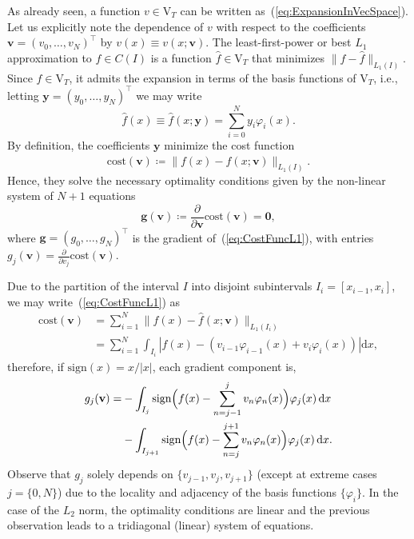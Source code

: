 \documentclass[a4paper,english]{IEEEtran}
\begin{document}
As already seen, a function $v\in{\mathrm{V}_{T}}$ can be written as~(\ref{eq:ExpansionInVecSpace}).
Let us explicitly note the dependence of $v$ with respect to the
coefficients ${\mathbf{v}}=(v_{0},\ldots,v_{N})^{\top}$ by $v(x)\equiv v(x;{\mathbf{v}})$.
The least-first-power or best ${L_{1}}$ approximation to $f\in C(I)$
is a function ${\hat{f}}\in{\mathrm{V}_{T}}$ that minimizes $\|f-{\hat{f}}\|_{{L_{1}}(I)}$.
Since ${\hat{f}}\in{\mathrm{V}_{T}}$, it admits the expansion in terms of the
basis functions of ${\mathrm{V}_{T}}$, i.e., letting ${\mathbf{y}}=(y_{0},\ldots,y_{N})^{\top}$
we may write
\begin{equation}
{\hat{f}}(x)\equiv{\hat{f}}(x;{\mathbf{y}})=\sum_{i=0}^{N}y_{i}\varphi_{i}(x).\label{eq:DefBestLOneApproxCoeffsY}
\end{equation}
By definition, the coefficients ${\mathbf{y}}$ minimize the cost function
\begin{equation}
{\text{cost}}(\mathbf{v})\coloneqq\|f(x)-{\hat{f}}(x;{\mathbf{v}})\|_{{L_{1}}(I)}.\label{eq:CostFuncL1}
\end{equation}
Hence, they solve the necessary optimality conditions given by the
non-linear system of $N+1$ equations
\begin{equation}
{\mathbf{g}}({\mathbf{v}})\coloneqq\frac{\partial}{\partial{\mathbf{v}}}{\text{cost}}({\mathbf{v}})=\mathbf{0},\label{eq:OptConditionsL1ComputeY}
\end{equation}
where ${\mathbf{g}}=(g_{0},\ldots,g_{N})^{\top}$ is the gradient of~(\ref{eq:CostFuncL1}),
with entries $g_{j}({\mathbf{v}})=\frac{\partial}{\partial v_{j}}{\text{cost}}({\mathbf{v}})$. 

Due to the partition of the interval $I$ into disjoint subintervals
$I_{i}=[x_{i-1},x_{i}]$, we may write~(\ref{eq:CostFuncL1}) as
\begin{align*}
{\text{cost}}({\mathbf{v}}) & =\sum_{i=1}^{N}\|f(x)-{\hat{f}}(x;{\mathbf{v}})\|_{{L_{1}}(I_{i})}\\
 & =\sum_{i=1}^{N}\int_{I_{i}}\left|{f}(x)-\left(v_{i-1}\varphi_{i-1}(x)+v_{i}\varphi_{i}(x)\right)\right|{\mathrm{d}} x,
\end{align*}
therefore, if ${\text{sign}}(x)=x/|x|$, each gradient component is,
\begin{align*}
g_{j}({\mathbf{v}})= & -\int_{I_{j}}{\text{sign}}\Bigl({f}(x)-\sum_{n=j-1}^{j}v_{n}\varphi_{n}(x)\Bigr)\varphi_{j}(x)\,{\mathrm{d}} x\\
 & -\int_{I_{j+1}}{\text{sign}}\Bigl({f}(x)-\sum_{n=j}^{j+1}v_{n}\varphi_{n}(x)\Bigr)\varphi_{j}(x)\,{\mathrm{d}} x.
\end{align*}
Observe that $g_{j}$ solely depends on $\{v_{j-1},v_{j},v_{j+1}\}$
(except at extreme cases $j=\{0,N\}$) due to the locality and adjacency
of the basis functions $\{\varphi_{i}\}$. In the case of the ${L_{2}}$
norm, the optimality conditions are linear and the previous observation
leads to a tridiagonal (linear) system of equations. 
\end{document}
